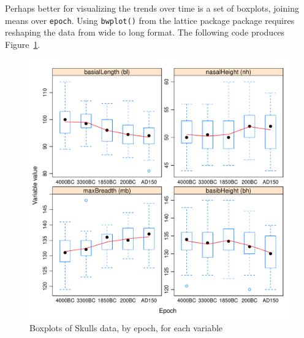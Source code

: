 \documentclass[11pt]{article}
\newcommand{\figref}[1]{Figure~\ref{#1}}
\newcommand{\pkg}[1]{{\textsf{#1} package}}
\newcommand{\code}[1]{{\texttt{#1}}}
\newcommand{\func}[1]{{\texttt{#1()}}}
\begin{document}
Perhaps better for visualizing the trends over time is a set of boxplots,
joining means over \code{epoch}. Using \func{bwplot} from the \pkg{lattice}
package requires reshaping the data from wide to long format.  The following
code produces \figref{fig:skulls-bwplot}.

\begin{Schunk}
\end{Schunk}
\begin{figure}[htb]
\begin{center}
	\includegraphics[width=.8\textwidth]{fig/plot-skulls-bwplot}
\caption{Boxplots of Skulls data, by epoch, for each variable}
\label{fig:skulls-bwplot}
\end{center}
\end{figure}
\end{document}
